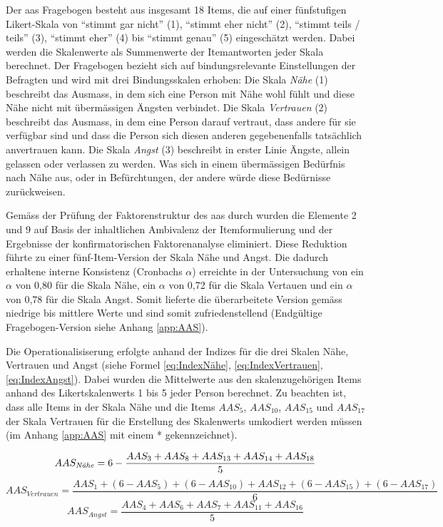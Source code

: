 Der \acrshort{aas} Fragebogen besteht aus insgesamt 18 Items, die auf einer fünfstufigen Likert-Skala von \enquote{stimmt gar nicht} (1), \enquote{stimmt eher nicht} (2), \enquote{stimmt teils / teils} (3), \enquote{stimmt eher} (4) bis \enquote{stimmt genau} (5) eingeschätzt werden. Dabei werden die Skalenwerte als Summenwerte der Itemantworten jeder Skala berechnet. Der Fragebogen bezieht sich auf bindungsrelevante Einstellungen der Befragten und wird mit drei Bindungsskalen erhoben: Die Skala \textit{Nähe} (1) beschreibt das Ausmass, in dem sich eine Person mit Nähe wohl fühlt und diese Nähe nicht mit übermässigen Ängsten verbindet. Die Skala \textit{Vertrauen} (2) beschreibt das Ausmass, in dem eine Person darauf vertraut, dass andere für sie verfügbar sind und dass die Person sich diesen anderen gegebenenfalls tatsächlich anvertrauen kann. Die Skala \textit{Angst} (3) beschreibt in erster Linie Ängste, allein gelassen oder verlassen zu werden. Was sich in einem übermässigen Bedürfnis nach Nähe aus, oder in Befürchtungen, der andere würde diese Bedürnisse zurückweisen. 

Gemäss der Prüfung der Faktorenstruktur des \acrshort{aas} durch  wurden die Elemente 2 und 9 auf Basis der inhaltlichen Ambivalenz der Itemformulierung und der Ergebnisse der konfirmatorischen Faktorenanalyse eliminiert. Diese Reduktion führte zu einer fünf-Item-Version der Skala Nähe und Angst. Die dadurch erhaltene interne Konsistenz (Cronbachs $\alpha$) erreichte in der Untersuchung von  ein $\alpha$ von 0,80 für die Skala Nähe, ein $\alpha$ von 0,72 für die Skala Vertauen und ein $\alpha$ von 0,78 für die Skala Angst. Somit lieferte die überarbeitete Version gemäss  niedrige bis mittlere Werte und sind somit zufriedenstellend (Endgültige Fragebogen-Version siehe Anhang \ref{app:AAS}).

Die Operationalisiserung erfolgte anhand der Indizes für die drei Skalen Nähe, Vertrauen und Angst (siehe Formel \ref{eq:IndexNähe}, \ref{eq:IndexVertrauen}, \ref{eq:IndexAngst}). Dabei wurden die Mittelwerte aus den skalenzugehörigen Items anhand des Likertskalenwerts 1 bis 5 jeder Person berechnet. Zu beachten ist, dass alle Items in der Skala Nähe und die Items $AAS_{5}$, $AAS_{10}$, $AAS_{15}$ und $AAS_{17}$ der Skala Vertrauen für die Erstellung des Skalenwerts umkodiert werden müssen (im Anhang \ref{app:AAS} mit einem * gekennzeichnet). 

\begin{equation}\label{eq:IndexNähe}
    AAS_{\text{\textit{N{\"a}he}}}=6-\frac{AAS_{3}+AAS_{8}+AAS_{13}+AAS_{14}+AAS_{18}}{5}
\end{equation}
\begin{equation}\label{eq:IndexVertrauen}
    AAS_{Vertrauen}=\frac{AAS_{1}+(6-AAS_{5})+(6-AAS_{10})+AAS_{12}+(6-AAS_{15})+(6-AAS_{17})}{6}
\end{equation}
\begin{equation}\label{eq:IndexAngst}
    AAS_{Angst}=\frac{AAS_{4}+AAS_{6}+AAS_{7}+AAS_{11}+AAS_{16}}{5}
\end{equation}

